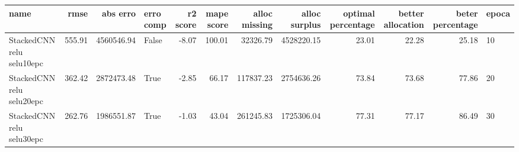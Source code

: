 \begin{tabular}{lrrlrrrrrrrl}
\toprule
name & rmse & abs erro & erro comp & r2 score & mape score & alloc missing & alloc surplus & optimal percentage & better allocation & beter percentage & epoca \\
\midrule
StackedCNN relu selu10epc & 555.91 & 4560546.94 & False & -8.07 & 100.01 & 32326.79 & 4528220.15 & 23.01 & 22.28 & 25.18 & 10 \\
StackedCNN relu selu20epc & 362.42 & 2872473.48 & True & -2.85 & 66.17 & 117837.23 & 2754636.26 & 73.84 & 73.68 & 77.86 & 20 \\
StackedCNN relu selu30epc & 262.76 & 1986551.87 & True & -1.03 & 43.04 & 261245.83 & 1725306.04 & 77.31 & 77.17 & 86.49 & 30 \\
\bottomrule
\end{tabular}
